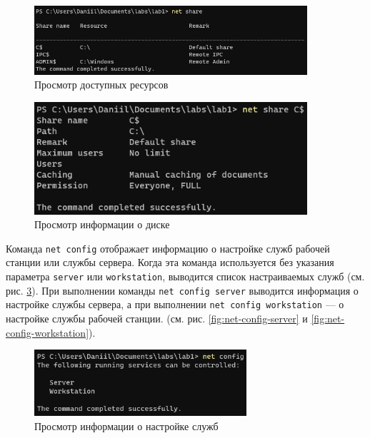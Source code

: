 \documentclass[a4paper, 14pt]{extarticle}
\begin{document}
\begin{figure}[H]
  \centering
  \includegraphics[width=0.9\textwidth]{images/net/share.png}
  \caption{Просмотр доступных ресурсов}
  \label{fig:net-share}
\end{figure}

\begin{figure}[H]
  \centering
  \includegraphics[width=0.9\textwidth]{images/net/share-disk.png}
  \caption{Просмотр информации о диске}
  \label{fig:net-share-disk}
\end{figure}

Команда \texttt{net config} отображает информацию о настройке служб рабочей
станции или службы сервера. Когда эта команда используется без указания
параметра \texttt{server} или \texttt{workstation}, выводится список
настраиваемых служб (см. рис. \ref{fig:net-config}). При выполнении команды
\texttt{net config server} выводится информация о настройке службы сервера, а
при выполнении \texttt{net config workstation} --- о настройке службы рабочей
станции. (см. рис. \ref{fig:net-config-server} и
\ref{fig:net-config-workstation}).

\begin{figure}[H]
  \centering
  \includegraphics[width=0.7\textwidth]{images/net/config.png}
  \caption{Просмотр информации о настройке служб}
  \label{fig:net-config}
\end{figure}
\end{document}

